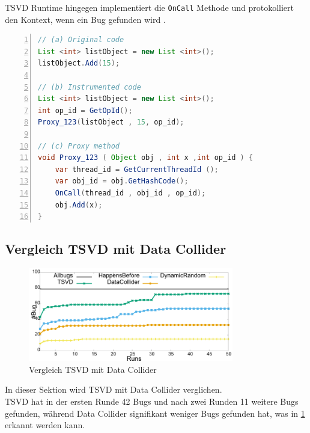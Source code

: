 \acs{TSVD} Runtime hingegen implementiert die \texttt{OnCall} Methode und protokolliert den Kontext, wenn ein Bug gefunden wird \cite[vgl.][170-171]{li_efficient_2019}.
\\
\begin{lstlisting}[language=Java,frame=tb,caption={\acs{TSVD} Proxy Aufrufe}, label={lst:TSVDImpl}, numbers=left, stepnumber=1, captionpos=b]
// (a) Original code
List <int> listObject = new List <int>();
listObject.Add(15); 
      
// (b) Instrumented code 
List <int> listObject = new List <int>(); 
int op_id = GetOpId(); 
Proxy_123(listObject , 15, op_id); 
     
// (c) Proxy method
void Proxy_123 ( Object obj , int x ,int op_id ) { 
    var thread_id = GetCurrentThreadId (); 
    var obj_id = obj.GetHashCode(); 
    OnCall(thread_id , obj_id , op_id); 
    obj.Add(x);
}
\end{lstlisting}

\subsection*{Vergleich TSVD mit Data Collider}

\begin{figure}[ht]
    \centering
    \includegraphics[width=0.8\textwidth]{gfx/TSVDvDataCollider.png}
    \caption{Vergleich TSVD mit Data Collider \cite[173]{li_efficient_2019}}
    \label{fig:TSVDvDataCollider}
\end{figure}

In dieser Sektion wird \acs{TSVD} mit Data Collider verglichen. \\
\acs{TSVD} hat in der ersten Runde 42 Bugs und nach zwei Runden 11 weitere Bugs gefunden, während Data Collider signifikant weniger Bugs gefunden hat, was in \ref{fig:TSVDvDataCollider} erkannt werden kann.